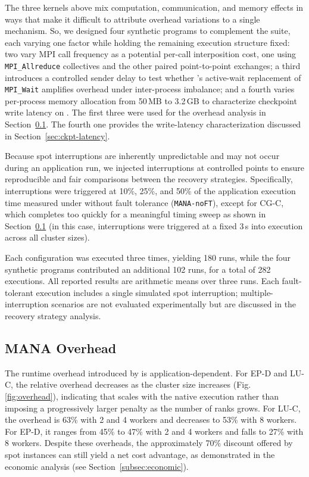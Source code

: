 \documentclass[conference]{IEEEtran}
\begin{document}
The three kernels above mix computation, communication, and memory effects in ways that
make it difficult to attribute \MANA overhead variations to a single mechanism.
So, we designed four synthetic programs to complement the \NPB suite, each varying one factor while holding
the remaining execution structure fixed: two vary MPI call frequency as a potential per-call
interposition cost, one using \texttt{MPI\_Allreduce} collectives and the other paired point-to-point
exchanges; a third introduces a controlled sender delay to test whether \MANA's active-wait replacement
of \texttt{MPI\_Wait} amplifies overhead under inter-process imbalance; and a fourth varies per-process
memory allocation from 50\,MB to 3.2\,GB to characterize checkpoint write latency on \EFS.
The first three were used for the overhead analysis in Section~\ref{sec:overhead}. The fourth one provides the
write-latency characterization discussed in Section~\ref{sec:ckpt-latency}.

Because \AWS spot interruptions are inherently unpredictable and may not occur during an application
run, we injected interruptions at controlled points to ensure reproducible and fair comparisons
between the recovery strategies. Specifically, interruptions were triggered at 10\%, 25\%, and 50\%
of the application execution time measured under \MANA without fault tolerance (\texttt{MANA-noFT}),
except for CG-C, which completes too quickly for a meaningful timing sweep
as shown in Section~\ref{sec:overhead} (in this case, interruptions were triggered at a
fixed 3\,s into execution across all cluster sizes). 

Each \NPB configuration was executed three times, 
yielding 180 runs, while the four synthetic programs contributed an additional 102 runs, for a
total of 282 executions.
%
All reported results are arithmetic means over three runs. Each
fault-tolerant execution includes a single simulated spot interruption; multiple-interruption
scenarios are not evaluated experimentally but are discussed in the recovery strategy analysis.

\subsection{MANA Overhead}
\label{sec:overhead}

The runtime overhead introduced by \MANA is application-dependent. For EP-D and LU-C, the relative overhead decreases as the cluster size increases (Fig. \ref{fig:overhead}), indicating that \MANA scales with the native \MPI execution rather than imposing a progressively larger penalty as the number of ranks grows. For LU-C, the overhead is 63\% with 2 and 4 workers and decreases to 53\% with 8 workers. For EP-D, it ranges from 45\% to 47\% with 2 and 4 workers and falls to 27\% with 8 workers. Despite these overheads, the approximately 70\% discount offered by spot instances can still yield a net cost advantage, as demonstrated in the economic analysis (see Section~\ref{subsec:economic}).
\end{document}
